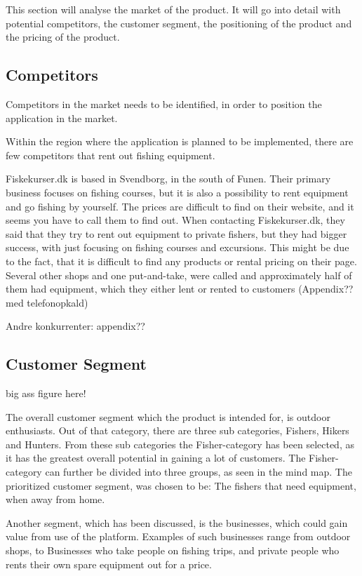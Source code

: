 This section will analyse the market of the product. It will go into detail with potential competitors, the customer segment, the positioning of the product and the pricing of the product.

\subsection{Competitors}
Competitors in the market needs to be identified, in order to position the application in the market.

Within the region where the application is planned to be implemented, there are few competitors that rent out fishing equipment. 

Fiskekurser.dk is based in Svendborg, in the south of Funen. Their primary business focuses on fishing courses, but it is also a possibility to rent equipment and go fishing by yourself.
The prices are difficult to find on their website, and it seems you have to call them to find out.
When contacting Fiskekurser.dk, they said that they try to rent out equipment to private fishers, but they had bigger success, with just focusing on fishing courses and excursions. This might be due to the fact, that it is difficult to find any products or rental pricing on their page.
Several other shops and one put-and-take, were called and approximately half of them had equipment, which they either lent or rented to customers (Appendix?? med telefonopkald)

Andre konkurrenter: appendix??


\subsection{Customer Segment}
{\color{red} big ass figure here!\\}

The overall customer segment  which the product is intended for, is outdoor enthusiasts. Out of that category, there are three sub categories, Fishers, Hikers and Hunters. From these sub categories the Fisher-category has been selected, as it has the greatest overall potential in gaining a lot of customers. The Fisher-category can further be divided into three groups, as seen in the mind map. The prioritized customer segment, was chosen to be: The fishers that need equipment, when away from home.  

Another segment, which has been discussed, is the businesses, which could gain value from use of the platform. Examples of such businesses range from outdoor shops, to Businesses who take people on fishing trips, and private people who rents their own spare equipment out for a price.

